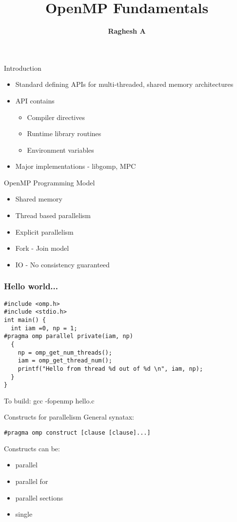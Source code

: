 \documentclass[10pt]{beamer}
\title{OpenMP Fundamentals}
\author{\textbf{Raghesh A}}
\date
\begin{document}
\begin{frame}
\titlepage
\end{frame}

\begin{frame}{Introduction}
\begin{itemize}
\item Standard defining APIs for multi-threaded, shared memory architectures
\item API contains
  \begin{itemize}
  \item Compiler directives
  \item Runtime library routines
  \item Environment variables
  \end{itemize}
\item Major implementations - libgomp, MPC
\end{itemize}
\end{frame}

\begin{frame}{OpenMP Programming Model}
\begin{itemize}
\item Shared memory
\item Thread based parallelism
\item Explicit parallelism
\item Fork - Join model
\item IO - No consistency guaranteed
\end{itemize}
\end{frame}

\begin{frame}[fragile]
\frametitle{Hello world...}
\begin{Verbatim}[formatcom=\color{red}]
#include <omp.h>
#include <stdio.h>
int main() {        
  int iam =0, np = 1;
#pragma omp parallel private(iam, np)
  {
    np = omp_get_num_threads();
    iam = omp_get_thread_num();
    printf("Hello from thread %d out of %d \n", iam, np);
  }
}
\end{Verbatim}
To build: gcc -fopenmp hello.c
\end{frame}

\begin{frame}[fragile]{Constructs for parallelism}
General synatax:
\begin{Verbatim}
#pragma omp construct [clause [clause]...]
\end{Verbatim}
Constructs can be:
\begin{itemize}
\item parallel
\item parallel for
\item parallel sections
\item single
\end{itemize}
\end{frame}
\end{document}
